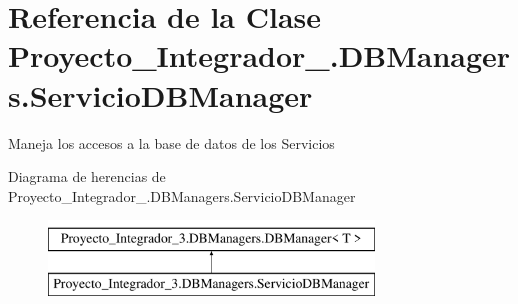 \hypertarget{class_proyecto___integrador__3_1_1_d_b_managers_1_1_servicio_d_b_manager}{\section{Referencia de la Clase Proyecto\-\_\-\-Integrador\-\_.\-D\-B\-Managers.\-Servicio\-D\-B\-Manager}
\label{class_proyecto___integrador__3_1_1_d_b_managers_1_1_servicio_d_b_manager}
}


Maneja los accesos a la base de datos de los Servicios  


Diagrama de herencias de Proyecto\-\_\-\-Integrador\-\_.\-D\-B\-Managers.\-Servicio\-D\-B\-Manager\begin{figure}[H]
\begin{center}
\leavevmode
\includegraphics[height=2.000000cm]{d7/de5/class_proyecto___integrador__3_1_1_d_b_managers_1_1_servicio_d_b_manager}
\end{center}
\end{figure}
